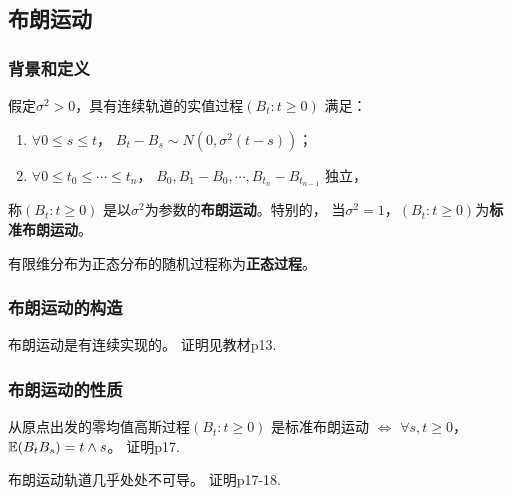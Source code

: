 \documentclass[main]{subfiles}
\begin{document}
\subsection{布朗运动}
\subsubsection{背景和定义}
\begin{definition}\label{def:Brownian}
  假定\(\sigma^2 >0\)，具有连续轨道的实值过程\((B_t: t \geq 0)\) 满足：
  \begin{enumerate}
    \item \(\forall 0 \leq s \leq t\)， \(B_t-B_s \sim N(0,\sigma^2(t-s))\)；
    \item \(\forall 0 \leq t_0 \leq \cdots \leq t_n\)， \(B_0, B_1-B_0,\cdots,B_{t_n}-B_{t_{n-1}}\) 独立，
  \end{enumerate}
  称\((B_t:t \geq 0)\) 是以\(\sigma^2\)为参数的\textbf{布朗运动}。特别的，
  当\(\sigma^2=1\)，\((B_t: t \geq 0)\)为\textbf{标准布朗运动}。
\end{definition}
\begin{definition}\label{def:正态过程}
  有限维分布为正态分布的随机过程称为\textbf{正态过程}。
\end{definition}
\subsubsection{布朗运动的构造}
\begin{theorem}\label{the:布朗运动存在}
  布朗运动是有连续实现的。
  证明见教材p13.
\end{theorem}
\subsubsection{布朗运动的性质}
\begin{theorem}\label{the:1.3.6}
  从原点出发的零均值高斯过程\((B_t: t \geq 0)\) 是标准布朗运动 \(\iff\) \(\forall s, t \geq 0\)，
  \(\mathbb{E}(B_tB_s)=t \wedge s\)。
  证明p17.
\end{theorem}
\begin{theorem}\label{the:1.3.7}
  布朗运动轨道几乎处处不可导。
  证明p17-18.
\end{theorem}
\end{document}
